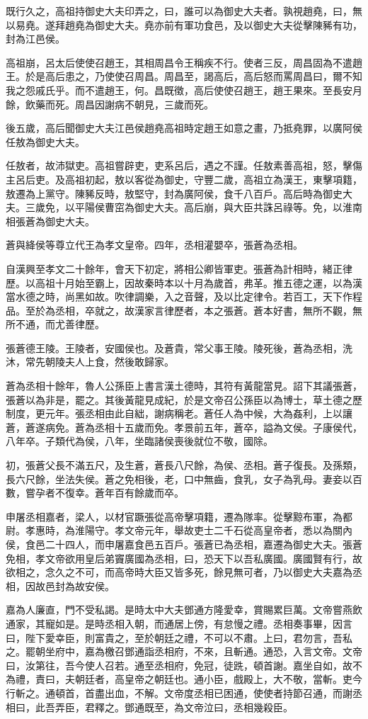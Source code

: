 既行久之，高祖持御史大夫印弄之，曰，誰可以為御史大夫者。孰視趙堯，曰，無以易堯。遂拜趙堯為御史大夫。堯亦前有軍功食邑，及以御史大夫從擊陳豨有功，封為江邑侯。

高祖崩，呂太后使使召趙王，其相周昌令王稱疾不行。使者三反，周昌固為不遣趙王。於是高后患之，乃使使召周昌。周昌至，謁高后，高后怒而罵周昌曰，爾不知我之怨戚氏乎。而不遣趙王，何。昌既徵，高后使使召趙王，趙王果來。至長安月餘，飲藥而死。周昌因謝病不朝見，三歲而死。

後五歲，高后聞御史大夫江邑侯趙堯高祖時定趙王如意之畫，乃抵堯罪，以廣阿侯任敖為御史大夫。

任敖者，故沛獄吏。高祖嘗辟吏，吏系呂后，遇之不謹。任敖素善高祖，怒，擊傷主呂后吏。及高祖初起，敖以客從為御史，守豐二歲，高祖立為漢王，東擊項籍，敖遷為上黨守。陳豨反時，敖堅守，封為廣阿侯，食千八百戶。高后時為御史大夫。三歲免，以平陽侯曹窋為御史大夫。高后崩，與大臣共誅呂祿等。免，以淮南相張蒼為御史大夫。

蒼與絳侯等尊立代王為孝文皇帝。四年，丞相灌嬰卒，張蒼為丞相。

自漢興至孝文二十餘年，會天下初定，將相公卿皆軍吏。張蒼為計相時，緒正律歷。以高祖十月始至霸上，因故秦時本以十月為歲首，弗革。推五德之運，以為漢當水德之時，尚黑如故。吹律調樂，入之音聲，及以比定律令。若百工，天下作程品。至於為丞相，卒就之，故漢家言律歷者，本之張蒼。蒼本好書，無所不觀，無所不通，而尤善律歷。

張蒼德王陵。王陵者，安國侯也。及蒼貴，常父事王陵。陵死後，蒼為丞相，洗沐，常先朝陵夫人上食，然後敢歸家。

蒼為丞相十餘年，魯人公孫臣上書言漢土德時，其符有黃龍當見。詔下其議張蒼，張蒼以為非是，罷之。其後黃龍見成紀，於是文帝召公孫臣以為博士，草土德之歷制度，更元年。張丞相由此自絀，謝病稱老。蒼任人為中候，大為姦利，上以讓蒼，蒼遂病免。蒼為丞相十五歲而免。孝景前五年，蒼卒，謚為文侯。子康侯代，八年卒。子類代為侯，八年，坐臨諸侯喪後就位不敬，國除。

初，張蒼父長不滿五尺，及生蒼，蒼長八尺餘，為侯、丞相。蒼子復長。及孫類，長六尺餘，坐法失侯。蒼之免相後，老，口中無齒，食乳，女子為乳母。妻妾以百數，嘗孕者不復幸。蒼年百有餘歲而卒。

申屠丞相嘉者，梁人，以材官蹶張從高帝擊項籍，遷為隊率。從擊黥布軍，為都尉。孝惠時，為淮陽守。孝文帝元年，舉故吏士二千石從高皇帝者，悉以為關內侯，食邑二十四人，而申屠嘉食邑五百戶。張蒼已為丞相，嘉遷為御史大夫。張蒼免相，孝文帝欲用皇后弟竇廣國為丞相，曰，恐天下以吾私廣國。廣國賢有行，故欲相之，念久之不可，而高帝時大臣又皆多死，餘見無可者，乃以御史大夫嘉為丞相，因故邑封為故安侯。

嘉為人廉直，門不受私謁。是時太中大夫鄧通方隆愛幸，賞賜累巨萬。文帝嘗燕飲通家，其寵如是。是時丞相入朝，而通居上傍，有怠慢之禮。丞相奏事畢，因言曰，陛下愛幸臣，則富貴之，至於朝廷之禮，不可以不肅。上曰，君勿言，吾私之。罷朝坐府中，嘉為檄召鄧通詣丞相府，不來，且斬通。通恐，入言文帝。文帝曰，汝第往，吾今使人召若。通至丞相府，免冠，徒跣，頓首謝。嘉坐自如，故不為禮，責曰，夫朝廷者，高皇帝之朝廷也。通小臣，戲殿上，大不敬，當斬。吏今行斬之。通頓首，首盡出血，不解。文帝度丞相已困通，使使者持節召通，而謝丞相曰，此吾弄臣，君釋之。鄧通既至，為文帝泣曰，丞相幾殺臣。

